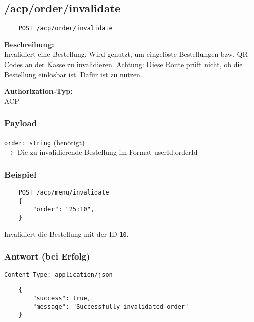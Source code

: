 \subsection{/acp/order/invalidate}

\begin{lstlisting}
    POST /acp/order/invalidate
\end{lstlisting}

\textbf{Beschreibung:} \\
Invalidiert eine Bestellung. Wird genutzt, um eingelöste Bestellungen bzw. QR-Codes an der Kasse zu invalidieren. Achtung: Diese Route prüft nicht, ob die Bestellung einlösbar ist. Dafür ist  zu nutzen.

\textbf{Authorization-Typ:} \\
ACP

\subsubsection{Payload}

\lstinline{order: string} (benötigt) \\
$\rightarrow$ Die zu invalidierende Bestellung im Format \glqq userId:orderId\grqq

\subsubsection{Beispiel}

\begin{lstlisting}
    POST /acp/menu/invalidate
    {
        "order": "25:10",
    }
\end{lstlisting}

Invalidiert die Bestellung mit der ID \lstinline{10}.

\subsubsection{Antwort (bei Erfolg)}

\lstinline{Content-Type: application/json}
\begin{lstlisting}
    {
        "success": true, 
        "message": "Successfully invalidated order"
    }
\end{lstlisting}